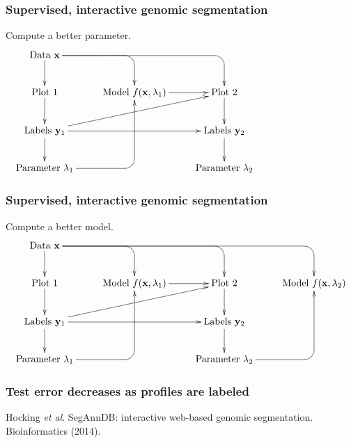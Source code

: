 \documentclass{beamer}
\begin{document}
\begin{frame}
  \frametitle{Supervised, interactive genomic segmentation}
  Compute a better parameter.
  \small
  \begin{displaymath}
  \xymatrix{
    \text{Data $\mathbf x$}
    \ar `[r] [dr] 
    \ar `r[rr] [drr] 
    \ar [d]
    & \text{ }
    & \text{ }
    & \text{ }
    \\
    \text{Plot 1} 
    \ar [d]
    & 
    \text{Model $f(\mathbf x, \lambda_1)$} 
    \ar [r]
    &
    \text{Plot 2} 
    \ar [d]
    & 
    \color{white}{\text{Model $f(\mathbf x, \lambda_2)$} }
    \\
    \text{Labels $\mathbf y_1$}       
    \ar [d]
    \ar [rr]
    \ar [rru]
    &
    &
    \text{Labels $\mathbf y_2$}
    \ar [d]
    \\
    \text{Parameter $\lambda_1$} 
    \ar `r[ruu] [ruu]
    & \text{ }
    & \text{Parameter $\lambda_2$}
  }
  \end{displaymath}
\end{frame}


\begin{frame}
  \frametitle{Supervised, interactive genomic segmentation}
  Compute a better model.
  \small
  \begin{displaymath}
  \xymatrix{
    \text{Data $\mathbf x$}
    \ar `[r] [dr] 
    \ar `r[rr] [drr] 
    \ar `r[rrr] [drrr] 
    \ar [d]
    & \text{ }
    & \text{ }
    & \text{ }
    \\
    \text{Plot 1} 
    \ar [d]
    & 
    \text{Model $f(\mathbf x, \lambda_1)$} 
    \ar [r]
    &
    \text{Plot 2} 
    \ar [d]
    & 
    \text{Model $f(\mathbf x, \lambda_2)$} 
    \\
    \text{Labels $\mathbf y_1$}       
    \ar [d]
    \ar [rr]
    \ar [rru]
    &
    &
    \text{Labels $\mathbf y_2$}
    \ar [d]
    \\
    \text{Parameter $\lambda_1$} 
    \ar `r[ruu] [ruu]
    & \text{ }
    & \text{Parameter $\lambda_2$}
    \ar `r[ruu] [ruu]
  }
  \end{displaymath}
\end{frame}

\begin{frame}
  \frametitle{Test error decreases as profiles are labeled}
  Hocking \textit{et al}. SegAnnDB: interactive web-based genomic
  segmentation. Bioinformatics (2014).
  \begin{center}
    
  \end{center}
\end{frame}
\end{document}

